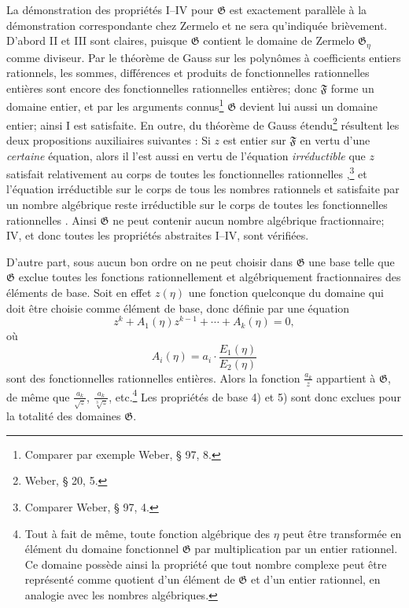 La démonstration des propriétés I--IV pour $\mathfrak G$ est exactement parallèle à la démonstration correspondante chez Zermelo et ne sera qu'indiquée brièvement. D'abord II et III sont claires, puisque $\mathfrak G$ contient le domaine de Zermelo $\mathfrak G_\eta$ comme diviseur. Par le théorème de Gauss sur les polynômes à coefficients entiers rationnels, les sommes, différences et produits de fonctionnelles rationnelles entières sont encore des fonctionnelles rationnelles entières; donc $\mathfrak F$ forme un domaine entier, et par les arguments connus\footnote{Comparer par exemple Weber, \S{} 97, 8.} $\mathfrak G$ devient lui aussi un domaine entier; ainsi I est satisfaite. En outre, du théorème de Gauss étendu\footnote{Weber, \S{} 20, 5.} résultent les deux propositions auxiliaires suivantes : \og{} Si $z$ est entier sur $\mathfrak F$ en vertu d'une \emph{certaine} équation, alors il l'est aussi en vertu de l'équation \emph{irréductible} que $z$ satisfait relativement au corps de toutes les fonctionnelles rationnelles \fg{},\footnote{Comparer Weber, \S{} 97, 4.} et \og{} l'équation irréductible sur le corps de tous les nombres rationnels et satisfaite par un nombre algébrique reste irréductible sur le corps de toutes les fonctionnelles rationnelles \fg{}. Ainsi $\mathfrak G$ ne peut contenir aucun nombre algébrique fractionnaire; IV, et donc toutes les propriétés abstraites I--IV, sont vérifiées.

D'autre part, sous aucun bon ordre on ne peut choisir dans $\mathfrak G$ une base telle que $\mathfrak G$ exclue toutes les fonctions rationnellement et algébriquement fractionnaires des éléments de base. Soit en effet $z(\eta)$ une fonction quelconque du domaine qui doit être choisie comme élément de base, donc définie par une équation
\[
 z^k+A_1(\eta)z^{k-1}+\cdots+A_k(\eta)=0,
\]
où
\[
 A_i(\eta)=a_i\cdot\frac{E_1(\eta)}{E_2(\eta)}
\]
sont des fonctionnelles rationnelles entières. Alors la fonction $\frac{a_k}{z}$ appartient à $\mathfrak G$, de même que $\frac{a_k}{\sqrt z}$, $\frac{a_k}{\sqrt[3]z}$, etc.\footnote{Tout à fait de même, toute fonction algébrique des $\eta$ peut être transformée en élément du domaine fonctionnel $\mathfrak G$ par multiplication par un entier rationnel. Ce domaine possède ainsi la propriété que tout nombre complexe peut être représenté comme quotient d'un élément de $\mathfrak G$ et d'un entier rationnel, en analogie avec les nombres algébriques.} Les propriétés de base 4) et 5) sont donc exclues pour la totalité des domaines $\mathfrak G$.

